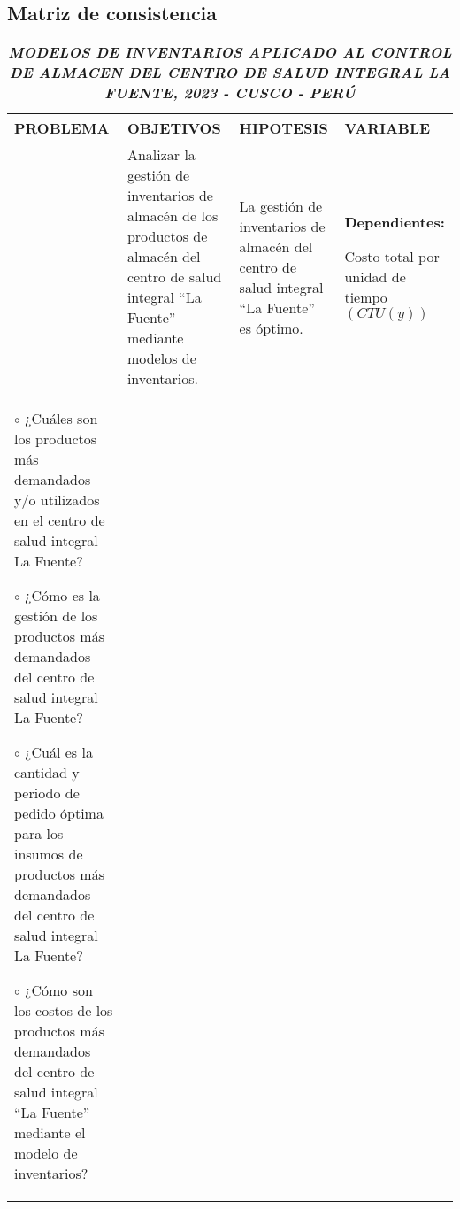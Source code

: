 \begin{landscape} %
\subsection{Matriz de consistencia}


\begin{table}[h!]
    \caption{\textbf{\textsl{MODELOS DE INVENTARIOS APLICADO AL CONTROL DE ALMACEN DEL CENTRO DE SALUD INTEGRAL LA FUENTE, 2023 - CUSCO - PERÚ}}}
    \begin{tabular}{|>{\raggedright\arraybackslash}m{6.3cm}|>{\raggedright\arraybackslash}m{6.3cm}|>{\raggedright\arraybackslash}m{6.3cm}|>{\raggedright\arraybackslash}m{2.9cm}|}
        \hline
        \textbf{PROBLEMA} & \textbf{OBJETIVOS} & \textbf{HIPOTESIS} & \textbf{VARIABLE} \\
        \hline

        {\footnotesize ¿Cómo es la gestión de inventarios de almacén sobre los productos más demandados del centro de salud integral ``La Fuente''?} &

        {\footnotesize Analizar la gestión de inventarios de almacén de los productos de almacén del centro de salud integral ``La Fuente'' mediante modelos de inventarios.} & 

        {\footnotesize La gestión de inventarios de almacén del centro de salud integral ``La Fuente'' es óptimo.} & 
        {\footnotesize \textbf{Dependientes:}}\vspace{0.3cm}

        {\footnotesize Costo total por unidad de tiempo $(CTU(y))$} \\
        \hline

            {\footnotesize $\circ$ ¿Cuáles son los productos más demandados y/o utilizados en el centro de salud integral La Fuente?}\vspace{0.3cm}

            {\footnotesize $\circ$ ¿Cómo es la gestión de los productos más demandados del centro de salud integral La Fuente?}\vspace{0.3cm}

            {\footnotesize $\circ$ ¿Cuál es la cantidad y periodo de pedido óptima para los insumos de productos más demandados del centro de salud integral La Fuente?}\vspace{0.3cm}

            {\footnotesize $\circ$ ¿Cómo son los costos de los productos más demandados del centro de salud integral ``La Fuente'' mediante el modelo de inventarios?} & 


\end{tabular}
\end{table}
\end{landscape}
